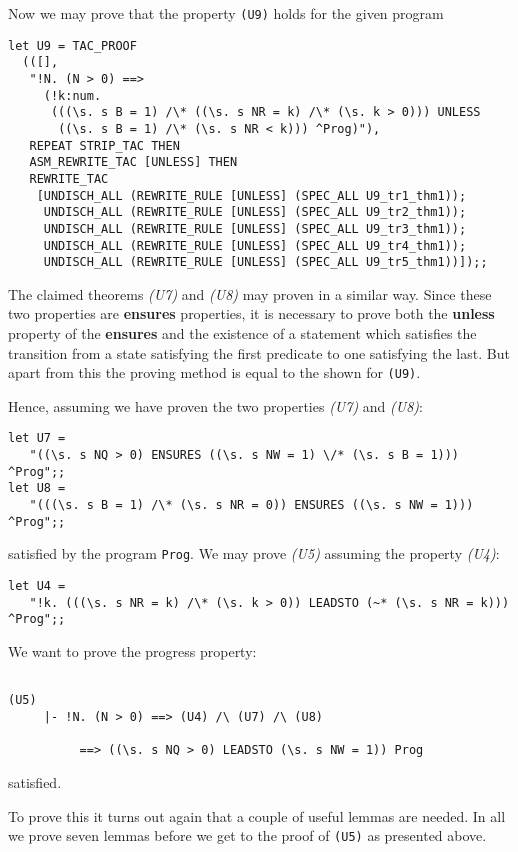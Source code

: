 Now we may prove that the property {\tt (U9)} holds for the given program

{\footnotesize 
\begin{verbatim}
let U9 = TAC_PROOF
  (([],
   "!N. (N > 0) ==>
     (!k:num.
      (((\s. s B = 1) /\* ((\s. s NR = k) /\* (\s. k > 0))) UNLESS
       ((\s. s B = 1) /\* (\s. s NR < k))) ^Prog)"),
   REPEAT STRIP_TAC THEN
   ASM_REWRITE_TAC [UNLESS] THEN
   REWRITE_TAC
    [UNDISCH_ALL (REWRITE_RULE [UNLESS] (SPEC_ALL U9_tr1_thm1));
     UNDISCH_ALL (REWRITE_RULE [UNLESS] (SPEC_ALL U9_tr2_thm1));
     UNDISCH_ALL (REWRITE_RULE [UNLESS] (SPEC_ALL U9_tr3_thm1));
     UNDISCH_ALL (REWRITE_RULE [UNLESS] (SPEC_ALL U9_tr4_thm1));
     UNDISCH_ALL (REWRITE_RULE [UNLESS] (SPEC_ALL U9_tr5_thm1))]);;
\end{verbatim}
}

The claimed theorems {\it (U7)} and {\it (U8)} may proven in a similar way.
Since these two properties are {\bf ensures} properties, it is necessary to
prove both the {\bf unless} property of the {\bf ensures} and the existence
of a statement which satisfies the transition from a state satisfying the
first predicate to one satisfying the last.  But apart from this the proving
method is equal to the shown for {\tt (U9)}.

Hence, assuming we have proven the two properties {\it (U7)} and {\it (U8)}:
{\footnotesize
\begin{verbatim}
let U7 =
   "((\s. s NQ > 0) ENSURES ((\s. s NW = 1) \/* (\s. s B = 1))) ^Prog";;
let U8 =
   "(((\s. s B = 1) /\* (\s. s NR = 0)) ENSURES ((\s. s NW = 1))) ^Prog";;
\end{verbatim}
}

satisfied by the program {\tt Prog}.  We may prove {\it (U5)} assuming the
property {\it (U4)}:
{\footnotesize
\begin{verbatim}
let U4 =
   "!k. (((\s. s NR = k) /\* (\s. k > 0)) LEADSTO (~* (\s. s NR = k))) ^Prog";;
\end{verbatim}
}

We want to prove the progress property:
{\footnotesize
\begin{verbatim}

(U5)
     |- !N. (N > 0) ==> (U4) /\ (U7) /\ (U8)

          ==> ((\s. s NQ > 0) LEADSTO (\s. s NW = 1)) Prog
\end{verbatim}
}
satisfied.

To prove this it turns out again that a couple of useful lemmas are needed.
In all we prove seven lemmas before we get to the proof of {\tt (U5)} as
presented above.

